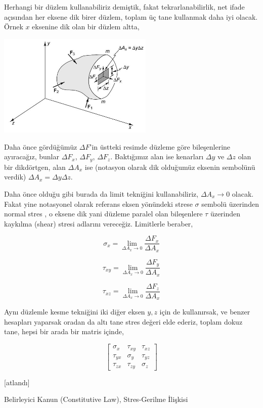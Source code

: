 \documentclass[12pt,fleqn]{article}\usepackage{../../common}
\begin{document}
Herhangi bir düzlem kullanabiliriz demiştik, fakat tekrarlanabilirlik, net ifade
açısından her eksene dik birer düzlem, toplam üç tane kullanmak daha iyi
olacak. Örnek $x$ eksenine dik olan bir düzlem altta,

\includegraphics[width=20em]{phy_020_strs_02_18.jpg}

Daha önce gördüğümüz $\Delta F$'in üstteki resimde düzleme göre bileşenlerine
ayıracağız, bunlar $\Delta F_x$, $\Delta F_y$, $\Delta F_z$. Baktığımız alan ise
kenarları $\Delta y$ ve $\Delta z$ olan bir dikdörtgen, alan $\Delta A_x$ ise
(notasyon olarak dik olduğumüz eksenin sembolünü verdik)
$\Delta A_x = \Delta y \Delta z$.

Daha önce olduğu gibi burada da limit tekniğini kullanabiliriz, $\Delta A_x \to
0$ olacak. Fakat yine notasyonel olarak referans eksen yönündeki strese $\sigma$
sembolü üzerinden normal stres , o eksene dik yani düzleme paralel olan
bileşenlere $\tau$ üzerinden kaykılma (shear) stresi adlarını vereceğiz.
Limitlerle beraber,

$$
\sigma_x = \lim_{\Delta A_x \to 0 } \frac{\Delta F_x}{\Delta A_x}
$$

$$
\tau_{xy} = \lim_{\Delta A_x \to 0 } \frac{\Delta F_y}{\Delta A_x}
$$

$$
\tau_{xz} = \lim_{\Delta A_x \to 0 } \frac{\Delta F_z}{\Delta A_x}
$$

Aynı düzlemle kesme tekniğini iki diğer eksen $y,z$ için de kullanırsak, ve
benzer hesapları yaparsak oradan da altı tane stres değeri elde ederiz, toplam
dokuz tane, hepsi bir arada bir matris içinde,

$$
\left[\begin{array}{rrr}
\sigma_x & \tau_{xy} & \tau_{xz} \\
\tau_{yx} & \sigma_y & \tau_{yz} \\
\tau_{zx} & \tau_{zy} & \sigma_z
\end{array}\right]
$$

[atlandı]

Belirleyici Kanun (Constitutive Law), Stres-Gerilme İlişkisi
\end{document}
